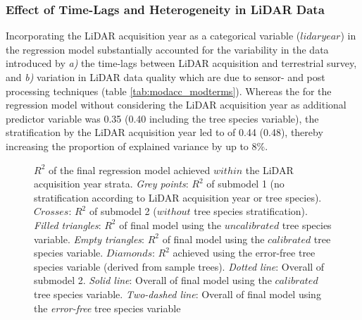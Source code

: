 \subsubsection*{Effect of Time-Lags and Heterogeneity in LiDAR Data}

Incorporating the LiDAR acquisition year as a categorical variable ($lidaryear$) in the regression model substantially accounted for the variability in the data introduced by \textit{a)} the time-lags between LiDAR acquisition and terrestrial survey, and \textit{b)} variation in LiDAR data quality which are due to sensor- and post processing techniques (table \ref{tab:modacc_modterms}). Whereas the \adjrsq{} for the regression model without considering the LiDAR acquisition year as additional predictor variable was 0.35 (0.40 including the tree species variable), the stratification by the LiDAR acquisition year led to \adjrsq{} of 0.44 (0.48), thereby increasing the proportion of explained variance by up to 8\%.

\begin{figure}[H]
\centering
{}
\caption{$R^2$ of the final regression model achieved $within$ the LiDAR acquisition year strata. 
         \textit{Grey points}: $R^2$ of submodel 1 (no stratification according to LiDAR acquisition year or tree species). 
         $Crosses$: $R^2$ of submodel 2 ($without$ tree species stratification). 
         \textit{Filled triangles}: $R^2$ of final model using the $uncalibrated$ tree species variable.
         \textit{Empty triangles}: $R^2$ of final model using the $calibrated$ tree species variable.
         $Diamonds$: $R^2$ achieved using the error-free tree species variable (derived from sample trees).
         \textit{Dotted line}: Overall \adjrsq{} of submodel 2.
         \textit{Solid line}: Overall \adjrsq{} of final model using the $calibrated$ tree species variable.
         \textit{Two-dashed line}: Overall \adjrsq{} of final model using the \textit{error-free} tree species variable}
\label{fig:r2adj_in_lyears}
\end{figure}

